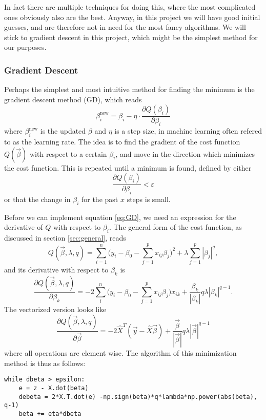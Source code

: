 In fact there are multiple techniques for doing this, where the most complicated ones obviously also are the best. Anyway, in this project we will have good initial guesses, and are therefore not in need for the most fancy algorithms. We will stick to gradient descent in this project, which might be the simplest method for our purposes.

\subsubsection{Gradient Descent} \label{sec:gd}
Perhaps the simplest and most intuitive method for finding the minimum is the gradient descent method (GD), which reads
\begin{equation}
\label{eq:GD}
\beta_i^{\text{new}}=\beta_i - \eta\cdot\frac{\partial Q(\beta_i)}{\partial\beta_i}
\end{equation}
where $\beta_i^{\text{new}}$ is the updated $\beta$ and $\eta$ is a step size, in machine learning often refered to as the learning rate. The idea is to find the gradient of the cost function $Q(\vec{\beta})$ with respect to a certain $\beta_i$, and move in the direction which minimizes the cost function. This is repeated until a minimum is found, defined by either
\begin{equation}
\frac{\partial Q(\beta_i)}{\partial\beta_i}<\varepsilon
\end{equation}
or that the change in $\beta_i$ for the past $x$ steps is small. 
\par 
\vspace{3mm}

Before we can implement equation \eqref{eq:GD}, we need an expression for the derivative of $Q$ with respect to $\beta_i$. The general form of the cost function, as discussed in section \ref{sec:general}, reads
\begin{equation}
Q(\vec{\beta},\lambda,q)=\sum_{i=1}^{n}\Big(y_i-\beta_0-\sum_{j=1}^px_{ij}\beta_j\Big)^2+\lambda\sum_{j=1}^p|\beta_j|^q,
\label{eq:cost_gen}
\end{equation}
and its derivative with respect to $\beta_k$ is
\begin{equation}
\frac{\partial Q(\vec{\beta},\lambda,q)}{\partial\beta_k}=-2\sum_i^n\Big(y_i-\beta_0-\sum_{j=1}^px_{ij}\beta_j\Big)x_{ik}+\frac{\beta_k}{|\beta_k|}q\lambda|\beta_k|^{q-1}.
\label{eq:der_cost_gen}
\end{equation}
The vectorized version looks like
\begin{equation}
\frac{\partial Q(\vec{\beta},\lambda,q)}{\partial\vec{\beta}}=-2\hat{X}^T(\vec{y}-\hat{X}\vec{\beta})+\frac{\vec{\beta}}{|\vec{\beta}|}q\lambda|\vec{\beta}|^{q-1}
\label{eq:der_cost_gen_vec}
\end{equation}
where all operations are element wise. The algorithm of this minimization method is thus as follows:

\lstset{basicstyle=\scriptsize}
\begin{lstlisting}
while dbeta > epsilon:
	e = z - X.dot(beta)
    debeta = 2*X.T.dot(e) -np.sign(beta)*q*lambda*np.power(abs(beta), q-1)
    beta += eta*dbeta
\end{lstlisting}